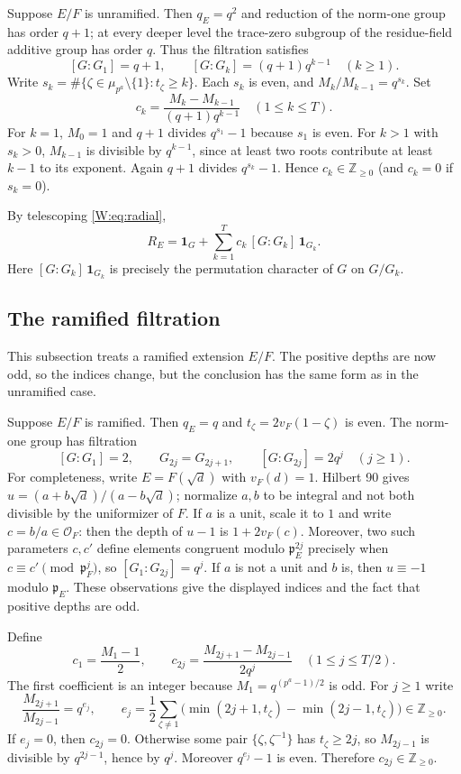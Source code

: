 Suppose $E/F$ is unramified. Then $q_E=q^2$ and reduction of the norm-one group has order $q+1$; at every deeper level the trace-zero subgroup of the residue-field additive group has order $q$. Thus the filtration satisfies
\[
 [G:G_1]=q+1,\qquad [G:G_k]=(q+1)q^{k-1}\quad(k\geq1).
\]
Write $s_k=\#\{\zeta\in\mu_{p^a}\setminus\{1\}:t_\zeta\geq k\}$. Each $s_k$ is even, and $M_k/M_{k-1}=q^{s_k}$.
Set
\[
 c_k=\frac{M_k-M_{k-1}}{(q+1)q^{k-1}}\quad(1\leq k\leq T).
\]
For $k=1$, $M_0=1$ and $q+1$ divides $q^{s_1}-1$ because $s_1$ is even. For $k>1$ with $s_k>0$, $M_{k-1}$ is divisible by $q^{k-1}$, since at least two roots contribute at least $k-1$ to its exponent. Again $q+1$ divides $q^{s_k}-1$. Hence $c_k\in\mathbb Z_{\geq0}$ (and $c_k=0$ if $s_k=0$).

By telescoping \eqref{W:eq:radial},
\begin{equation}\label{W:eq:unram}
 \boxed{R_E=\mathbf1_G+\sum_{k=1}^T c_k\,[G:G_k]\,\mathbf1_{G_k}.}
\end{equation}
Here $[G:G_k]\,\mathbf1_{G_k}$ is precisely the permutation character of $G$ on $G/G_k$.

\subsection{The ramified filtration}
This subsection treats a ramified extension $E/F$. The positive depths are now odd, so the indices change, but the conclusion has the same form as in the unramified case.

Suppose $E/F$ is ramified. Then $q_E=q$ and $t_\zeta=2v_F(1-\zeta)$ is even. The norm-one group has filtration
\[
 [G:G_1]=2,\qquad G_{2j}=G_{2j+1},\qquad [G:G_{2j}]=2q^j\quad(j\geq1).
\]
For completeness, write $E=F(\sqrt d)$ with $v_F(d)=1$. Hilbert 90 gives $u=(a+b\sqrt d)/(a-b\sqrt d)$; normalize $a,b$ to be integral and not both divisible by the uniformizer of $F$. If $a$ is a unit, scale it to $1$ and write $c=b/a\in\mathcal O_F$: then the depth of $u-1$ is $1+2v_F(c)$. Moreover, two such parameters $c,c'$ define elements congruent modulo $\mathfrak p_E^{2j}$ precisely when $c\equiv c'\pmod{\mathfrak p_F^j}$, so $[G_1:G_{2j}]=q^j$. If $a$ is not a unit and $b$ is, then $u\equiv-1$ modulo $\mathfrak p_E$. These observations give the displayed indices and the fact that positive depths are odd.

Define
\[
 c_1=\frac{M_1-1}{2},\qquad
 c_{2j}=\frac{M_{2j+1}-M_{2j-1}}{2q^j}\quad(1\leq j\leq T/2).
\]
The first coefficient is an integer because $M_1=q^{(p^a-1)/2}$ is odd. For $j\geq1$ write
\[
 \frac{M_{2j+1}}{M_{2j-1}}=q^{e_j},\qquad
 e_j=\frac12\sum_{\zeta\ne1}\bigl(\min(2j+1,t_\zeta)-\min(2j-1,t_\zeta)\bigr)\in\mathbb Z_{\geq0}.
\]
If $e_j=0$, then $c_{2j}=0$. Otherwise some pair $\{\zeta,\zeta^{-1}\}$ has $t_\zeta\geq2j$, so $M_{2j-1}$ is divisible by $q^{2j-1}$, hence by $q^j$. Moreover $q^{e_j}-1$ is even. Therefore $c_{2j}\in\mathbb Z_{\geq0}$.

